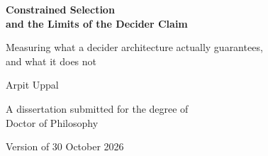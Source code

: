 \begin{titlepage}
\thispagestyle{empty}
\centering

\vspace*{0.55in}

{\Huge\bfseries Constrained Selection\\[0.35em]
and the Limits of the Decider Claim\par}

\vspace{0.7em}

{\Large Measuring what a decider architecture actually guarantees,\\[0.18em]
and what it does not\par}

\vspace{1.65in}

{\LARGE Arpit Uppal\par}

\vspace{1.0in}

{\large A dissertation submitted for the degree of\\[0.25em]
Doctor of Philosophy\par}

\vfill

{\large Version of 30 October 2026\par}

\end{titlepage}
